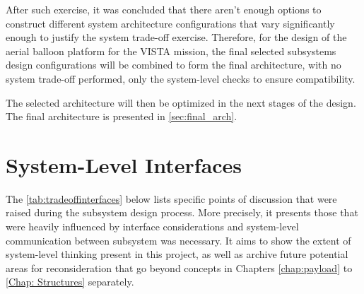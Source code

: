 After such exercise, it was concluded that there aren't enough options to construct different system architecture configurations that vary significantly enough to justify the system trade-off exercise. Therefore, for the design of the aerial balloon platform for the VISTA mission, the final selected subsystems design configurations will be combined to form the final architecture, with no system trade-off performed, only the system-level checks to ensure compatibility. 

The selected architecture will then be optimized in the next stages of the design. The final architecture is presented in \autoref{sec:final_arch}.

\section{System-Level Interfaces}\label{sec:coupling_map}
\label{sec:elimination}

The \autoref{tab:tradeoffinterfaces} below lists specific points of discussion that were raised during the subsystem design process. More precisely, it presents those that were heavily influenced by interface considerations and system-level communication between subsystem was necessary. It aims to show the extent of system-level thinking present in this project, as well as archive future potential areas for reconsideration that go beyond concepts in Chapters \ref{chap:payload} to \ref{Chap: Structures} separately.

